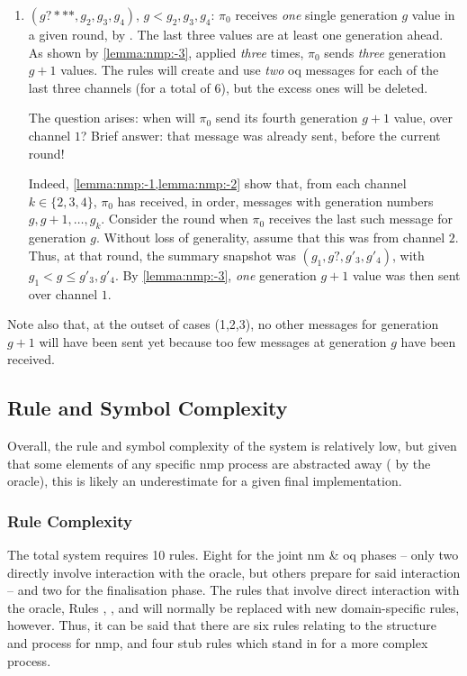 \begin{remark}
\begin{enumerate}
    \medskip
    \item $(g?***, g_2, g_3, g_4)$, $g < g_2, g_3, g_4$: 
    $\pi_0$ receives \emph{one} single generation $g$ value in a given round, by .
    The last three values are at least one generation ahead.
    As shown by \cref{lemma:nmp:-3}, applied \emph{three} times, 
    $\pi_0$ sends \emph{three} generation $g+1$ values.
    The rules will create and use \emph{two} \gls{oq} messages for each of the last three channels (for a total of 6), but the excess ones will be deleted.
    
    \medskip
    The question arises: when will $\pi_0$ send its fourth generation $g+1$ value, over channel $1$? Brief answer: that message was already sent,
    before the current round!
    
    \medskip
    Indeed, \cref{lemma:nmp:-1,lemma:nmp:-2} show that,
    from each channel $k \in \{ 2, 3, 4\}$, 
    $\pi_0$ has received, in order, 
    messages with generation numbers $g, g+1, \ldots, g_k$.
    Consider the round when $\pi_0$ receives the last such message for generation $g$. Without loss of generality, assume that this was from channel $2$.
    Thus, at that round, the summary snapshot was $(g_1, g?, g'_3, g'_4)$,
    with $g_1 < g \leq g'_3, g'_4$.
    By \cref{lemma:nmp:-3}, \emph{one} generation $g+1$ value was then sent over channel $1$.
    \end{enumerate}    
    
    Note also that, at the outset of cases (1,2,3), no other messages for generation $g+1$ will have been sent yet because too few messages at generation $g$ have been received.
\end{remark}

\subsection{Rule and Symbol Complexity}
Overall, the rule and symbol complexity of the system is relatively low, but given that some elements of any specific \gls{nmp} process are abstracted away (\eg{} by the oracle), this is likely an underestimate for a given final implementation.

\subsubsection{Rule Complexity}
The total system requires 10 rules.  Eight for the joint \gls{nm} \& \gls{oq} phases -- only two directly involve interaction with the oracle, but others prepare for said interaction -- and two for the finalisation phase.  The rules that involve direct interaction with the oracle, Rules , ,  and  will normally be replaced with new domain-specific rules, however.  Thus, it can be said that there are six rules relating to the structure and process for \gls{nmp}, and four stub rules which stand in for a more complex process.

